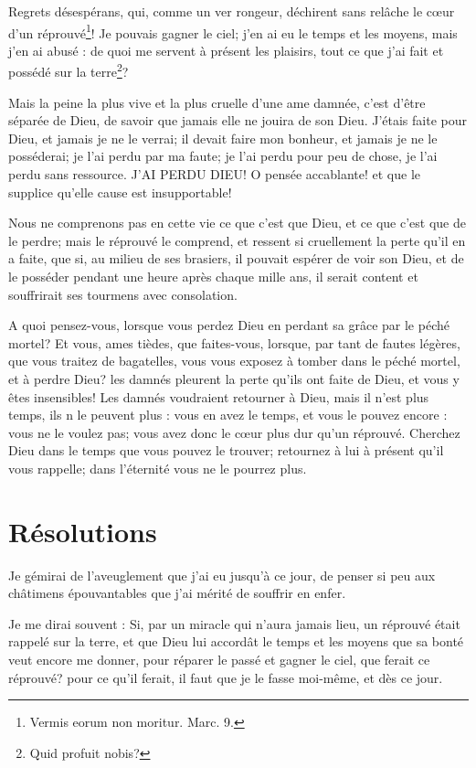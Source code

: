 \documentclass[instructions.tex]{subfiles}
\begin{document}
Regrets désespérans, qui, comme un ver rongeur, déchirent sans relâche le cœur d'un réprouvé\footnote{Vermis eorum non moritur. Marc. 9.}! Je pouvais gagner le ciel; j'en ai eu le temps et les moyens, mais j'en ai abusé : de quoi me servent à présent les plaisirs, tout ce que j'ai fait et possédé sur la terre\footnote{Quid profuit nobis?}?

\secundo Mais la peine la plus vive et la plus cruelle d'une ame damnée, c'est d'être séparée de Dieu, de savoir que jamais elle ne jouira de son Dieu. J'étais faite pour Dieu, et jamais je ne le verrai; il devait faire mon bonheur, et jamais je ne le posséderai; je l'ai perdu par ma faute; je l'ai perdu pour peu de chose, je l'ai perdu sans ressource. J'AI PERDU DIEU! O pensée accablante! et que le supplice qu'elle cause est insupportable!

Nous ne comprenons pas en cette vie ce que c'est que Dieu, et ce que c'est que de le perdre; mais le réprouvé le comprend, et ressent si cruellement la perte qu'il en a faite, que si, au milieu de ses brasiers, il pouvait espérer de voir son Dieu, et de le posséder pendant une heure après chaque mille ans, il serait content et souffrirait ses tourmens avec consolation.

A quoi pensez-vous, lorsque vous perdez Dieu en perdant sa grâce par le péché mortel? Et vous, ames tièdes, que faites-vous, lorsque, par tant de fautes légères, que vous traitez de bagatelles, vous vous exposez à tomber dans le péché mortel, et à perdre Dieu? les damnés pleurent la perte qu'ils ont faite de Dieu, et vous y êtes insensibles! Les damnés voudraient retourner à Dieu, mais il n'est plus temps, ils n le peuvent plus : vous en avez le temps, et vous le pouvez encore : vous ne le voulez pas; vous avez donc le cœur plus dur qu'un réprouvé. Cherchez Dieu dans le temps que vous pouvez le trouver; retournez à lui à présent qu'il vous rappelle; dans l'éternité vous ne le pourrez plus.

\section{Résolutions}

\primo Je gémirai de l'aveuglement que j'ai eu jusqu'à ce jour, de penser si peu aux châtimens épouvantables que j'ai mérité de souffrir en enfer. 

\secundo Je me dirai souvent : Si, par un miracle qui n'aura jamais lieu, un réprouvé était rappelé sur la terre, et que Dieu lui accordât le temps et les moyens que sa bonté veut encore me donner, pour réparer le passé et gagner le ciel, que ferait ce réprouvé? pour ce qu'il ferait, il faut que je le fasse moi-même, et dès ce jour. 

 
\end{document}
